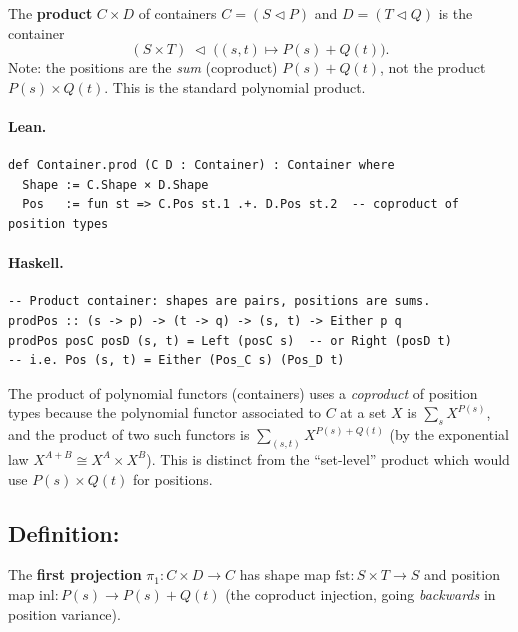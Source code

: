 \documentclass[11pt,a4paper]{article}
\begin{document}
\begin{defn}
The \textbf{product} $C \times D$ of containers $C = (S \triangleleft P)$ and
$D = (T \triangleleft Q)$ is the container
\[
  (S \times T) \;\triangleleft\; \bigl((s, t) \mapsto P(s) + Q(t)\bigr).
\]
Note: the positions are the \emph{sum} (coproduct) $P(s) + Q(t)$, not the
product $P(s) \times Q(t)$.  This is the standard polynomial product.
\end{defn}

\paragraph{Lean.}
\begin{lstlisting}[style=lean]
def Container.prod (C D : Container) : Container where
  Shape := C.Shape × D.Shape
  Pos   := fun st => C.Pos st.1 .+. D.Pos st.2  -- coproduct of position types
\end{lstlisting}

\paragraph{Haskell.}
\begin{lstlisting}[style=haskell]
-- Product container: shapes are pairs, positions are sums.
prodPos :: (s -> p) -> (t -> q) -> (s, t) -> Either p q
prodPos posC posD (s, t) = Left (posC s)  -- or Right (posD t)
-- i.e. Pos (s, t) = Either (Pos_C s) (Pos_D t)
\end{lstlisting}

\begin{fidelitynote}
The product of polynomial functors (containers) uses a \emph{coproduct} of
position types because the polynomial functor associated to $C$ at a set $X$ is
$\sum_s X^{P(s)}$, and the product of two such functors is
$\sum_{(s,t)} X^{P(s) + Q(t)}$ (by the exponential law $X^{A+B} \cong X^A
\times X^B$).  This is distinct from the ``set-level'' product which would use
$P(s) \times Q(t)$ for positions.
\end{fidelitynote}


\subsection{Definition: }

\begin{defn}
The \textbf{first projection} $\pi_1 : C \times D \to C$ has shape map
$\mathrm{fst} : S \times T \to S$ and position map $\mathrm{inl} : P(s) \to
P(s) + Q(t)$ (the coproduct injection, going \emph{backwards} in position
variance).
\end{defn}
\end{document}
